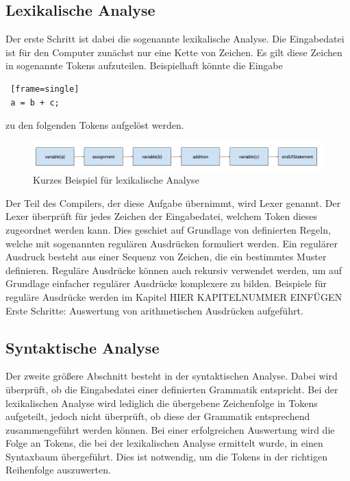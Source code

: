 \documentclass[12pt, a4paper, oneside, ngerman]{article}
\begin{document}
\subsection{Lexikalische Analyse}
Der erste Schritt ist dabei die sogenannte lexikalische Analyse. Die Eingabedatei ist für den Computer zunächst nur eine Kette von Zeichen. Es gilt diese Zeichen in sogenannte Tokens aufzuteilen. Beispielhaft könnte die Eingabe
\begin{lstlisting} [frame=single]
 a = b + c;
\end{lstlisting}

zu den folgenden Tokens aufgelöst werden.

\begin{figure}[h!]
\centering
\includegraphics[scale=0.37]{lex_beispiel.png}
\caption{Kurzes Beispiel für lexikalische Analyse}
\label{fig:method}
\end{figure}


Der Teil des Compilers, der diese Aufgabe übernimmt, wird Lexer genannt. Der Lexer überprüft für jedes Zeichen der Eingabedatei, welchem Token dieses zugeordnet werden kann. Dies geschiet auf Grundlage von definierten Regeln, welche mit sogenannten regulären Ausdrücken formuliert werden. Ein regulärer Ausdruck besteht aus einer Sequenz von Zeichen, die ein bestimmtes Muster definieren. Reguläre Ausdrücke können auch rekursiv verwendet werden, um auf Grundlage einfacher regulärer Ausdrücke komplexere zu bilden. Beispiele für reguläre Ausdrücke werden im Kapitel HIER KAPITELNUMMER EINFÜGEN Erste Schritte: Auswertung von arithmetischen Ausdrücken aufgeführt.

\subsection{Syntaktische Analyse}
Der zweite größere Abschnitt besteht in der syntaktischen Analyse. Dabei wird überprüft, ob die Eingabedatei einer definierten Grammatik entspricht. Bei der lexikalischen Analyse wird lediglich die übergebene Zeichenfolge in Tokens aufgeteilt, jedoch nicht überprüft, ob diese der Grammatik entsprechend zusammengeführt werden können. 
Bei einer erfolgreichen Auswertung wird die Folge an Tokens, die bei der lexikalischen Analyse ermittelt wurde, in einen Syntaxbaum übergeführt. Dies ist notwendig, um die Tokens in der richtigen Reihenfolge auszuwerten. 
\end{document}

